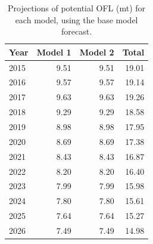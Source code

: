 \documentclass[12pt,]{article}
\begin{document}
\begin{table}[ht]
\centering
\caption{Projections of potential OFL (mt) for each model, using the base model forecast.} 
\label{tab:OFL_projection}
\begin{tabular}{lrrr}
  \hline
Year & Model 1 & Model 2 & Total \\ 
  \hline
2015 & 9.51 & 9.51 & 19.01 \\ 
  2016 & 9.57 & 9.57 & 19.14 \\ 
  2017 & 9.63 & 9.63 & 19.26 \\ 
  2018 & 9.29 & 9.29 & 18.58 \\ 
  2019 & 8.98 & 8.98 & 17.95 \\ 
  2020 & 8.69 & 8.69 & 17.38 \\ 
  2021 & 8.43 & 8.43 & 16.87 \\ 
  2022 & 8.20 & 8.20 & 16.40 \\ 
  2023 & 7.99 & 7.99 & 15.98 \\ 
  2024 & 7.80 & 7.80 & 15.61 \\ 
  2025 & 7.64 & 7.64 & 15.27 \\ 
  2026 & 7.49 & 7.49 & 14.98 \\ 
   \hline
\end{tabular}
\end{table}\begin{table}[ht]
\centering
\caption{Summary of 10-year 
                                             projections beginning in 2016 
                                             for alternate states of nature based on 
                                             an axis of uncertainty for the Northern model.  Columns range over low, mid, and high
                                             states of nature, and rows range over different 
                                             assumptions of catch levels. An entry of "--" 
                                             indicates that the stock is driven to very low 
                                             abundance under the particular scenario.} 
\label{tab:Decision_table_mod1}
\end{table}
\end{document}
